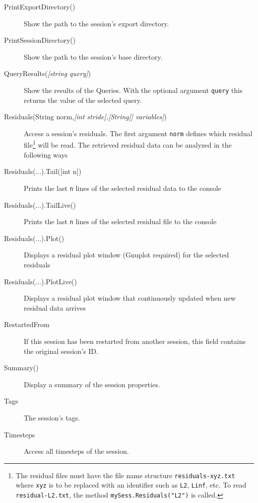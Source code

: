 \begin{description}
	\item[PrintExportDirectory()]
	Show the path to the session's export directory.
	
	\item[PrintSessionDirectory()]
	Show the path to the session's base directory.
	
	\item[QueryResults(\emph{{[}string query{]}})]
	Show the results of the Queries. With the optional argument \lstinline{query} this returns the value of the selected query.
	
	\item[Residuals(String norm,\emph{{[}int stride{]},{[}String{[}{]} variables{]}})]
	Access a session's residuals. The first argument \lstinline{norm} defines which residual file\footnote{The residual files must have the file name structure \lstinline{residuals-xyz.txt} where \lstinline{xyz} is to be replaced with an identifier such as \lstinline{L2}, \lstinline{Linf}, etc. To read \lstinline{residual-L2.txt}, the method \lstinline{mySess.Residuals("L2")} is called.} will be read. The retrieved residual data can be analyzed in the following ways
	
	\item[Residuals(...).Tail({[}int n{]})]
	Prints the last \lstinline{n} lines of the selected residual data to the console
	
	\item[Residuals(...).TailLive()]
	Prints the last \lstinline{n} lines of the selected residual file to the console
	
	\item[Residuals(...).Plot()]
	Displays a residual plot window (Gnuplot required) for the selected residuals
	
	\item[Residuals(...).PlotLive()]
	Displays a residual plot window that continuously updated when new residual data arrives
	
	\item[RestartedFrom]
	If this session has been restarted from another session, this field contains the original session's ID.
	
	\item[Summary()]
	Display a summary of the session properties.	
	
	\item[Tags]
	The session's tags.
	
	\item[Timesteps]
	Access all timesteps of the session.
\end{description}

